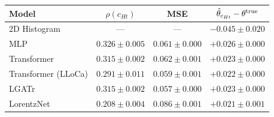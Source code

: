 \begin{tabular}{lccc}
\toprule
Model & $\rho(c_{Ht})$ & MSE & $\hat{\theta}_{c_{Ht}} - \theta^{\rm true}$ \\
\midrule
2D Histogram & — & — & $-0.045 \pm 0.020$ \\
MLP & $0.326 \pm 0.005$ & $0.061 \pm 0.000$ & $+0.026 \pm 0.000$ \\
Transformer & $0.315 \pm 0.002$ & $0.062 \pm 0.001$ & $+0.023 \pm 0.000$ \\
Transformer (LLoCa) & $0.291 \pm 0.011$ & $0.059 \pm 0.001$ & $+0.022 \pm 0.000$ \\
LGATr & $0.315 \pm 0.002$ & $0.057 \pm 0.000$ & $+0.023 \pm 0.000$ \\
LorentzNet & $0.208 \pm 0.004$ & $0.086 \pm 0.001$ & $+0.021 \pm 0.001$ \\
\bottomrule
\end{tabular}
